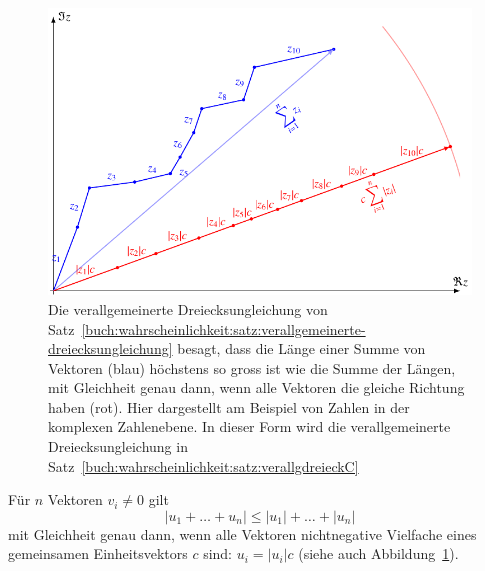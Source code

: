 \begin{figure}
\centering
\includegraphics{chapters/80-wahrscheinlichkeit/images/dreieck.pdf}
\caption{Die verallgemeinerte Dreiecksungleichung von
Satz~\ref{buch:wahrscheinlichkeit:satz:verallgemeinerte-dreiecksungleichung}
besagt, dass
die Länge einer Summe von Vektoren (blau) höchstens so gross ist wie die
Summe der Längen, mit Gleichheit genau dann, wenn alle Vektoren die
gleiche Richtung haben (rot).
Hier dargestellt am Beispiel von Zahlen in der komplexen Zahlenebene.
In dieser Form wird die verallgemeinerte Dreiecksungleichung in
Satz~\ref{buch:wahrscheinlichkeit:satz:verallgdreieckC}
\label{buch:wahrscheinlichkeit:fig:dreieck}}
\end{figure}

\begin{satz}
\label{buch:wahrscheinlichkeit:satz:verallgemeinerte-dreiecksungleichung}
Für $n$ Vektoren $v_i\ne 0$ gilt
\[
|u_1+\dots+u_n| \le |u_1|+\dots+|u_n|
\]
mit Gleichheit genau dann, wenn alle Vektoren nichtnegative Vielfache
eines gemeinsamen Einheitsvektors $c$ sind: $u_i=|u_i|c$
(siehe auch Abbildung~\ref{buch:wahrscheinlichkeit:fig:dreieck}).
\end{satz}

